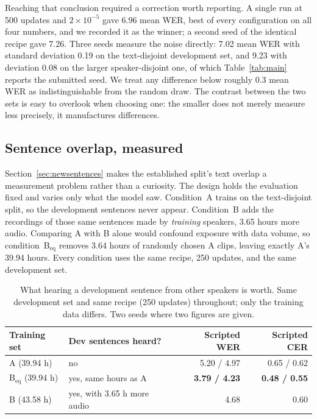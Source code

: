 Reaching that conclusion required a correction worth reporting. A single run at
500 updates and $2\times10^{-5}$ gave 6.96 mean WER, best of every
configuration on all four numbers, and we recorded it as the winner; a second
seed of the identical recipe gave 7.26. Three seeds measure the noise directly:
7.02 mean WER with standard deviation 0.19 on the text-disjoint development
set, and 9.23 with deviation 0.08 on the larger speaker-disjoint one, of which
Table~\ref{tab:main} reports the submitted seed. We treat any difference below
roughly 0.3 mean WER as indistinguishable from the random draw. The contrast between the two sets is easy to overlook when choosing one:
the smaller does not merely measure less precisely, it manufactures differences.

\subsection{Sentence overlap, measured}
\label{sec:overlap}

Section~\ref{sec:newsentences} makes the established split's text overlap a
measurement problem rather than a curiosity. The design holds the evaluation fixed and varies only what the model saw.
Condition~A trains on the text-disjoint split, so the development sentences
never appear. Condition~B adds the recordings of those same sentences made by
\emph{training} speakers, 3.65 hours more audio. Comparing A with B alone would
confound exposure with data volume, so condition~B$_{\text{eq}}$ removes 3.64
hours of randomly chosen A clips, leaving exactly A's 39.94 hours. Every
condition uses the same recipe, 250 updates, and the same development set.


\begin{table}[tb]
\centering\small
\caption{What hearing a development sentence from other speakers is worth.
Same development set and same recipe (250 updates) throughout; only the
training data differs. Two seeds where two figures are given.}
\label{tab:overlap}
\begin{tabular}{llrr}
\toprule
Training set & Dev sentences heard? & Scripted WER & Scripted CER \\
\midrule
A \quad (39.94 h) & no & 5.20 / 4.97 & 0.65 / 0.62 \\
B$_{\text{eq}}$ (39.94 h) & yes, same hours as A & \textbf{3.79 / 4.23} & \textbf{0.48 / 0.55} \\
B \quad (43.58 h) & yes, with 3.65 h more audio & 4.68 & 0.60 \\
\bottomrule
\end{tabular}
\end{table}


